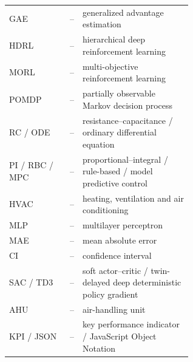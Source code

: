 \documentclass[11pt,a4paper]{article}
\renewcommand{\thetable}{S\arabic{table}}
\begin{document}
\begin{longtable}{@{}l l p{0.60\linewidth}@{}}
GAE & -- & generalized advantage estimation \\
HDRL & -- & hierarchical deep reinforcement learning \\
MORL & -- & multi-objective reinforcement learning \\
POMDP & -- & partially observable Markov decision process \\
RC / ODE & -- & resistance--capacitance / ordinary differential equation \\
PI / RBC / MPC & -- & proportional--integral / rule-based / model predictive control \\
HVAC & -- & heating, ventilation and air conditioning \\
MLP & -- & multilayer perceptron \\
MAE & -- & mean absolute error \\
CI & -- & confidence interval \\
SAC / TD3 & -- & soft actor--critic / twin-delayed deep deterministic policy gradient \\
AHU & -- & air-handling unit \\
KPI / JSON & -- & key performance indicator / JavaScript Object Notation \\
\bottomrule
\end{longtable}
\renewcommand{\thetable}{S\arabic{table}}
\setcounter{table}{0}
\end{document}
